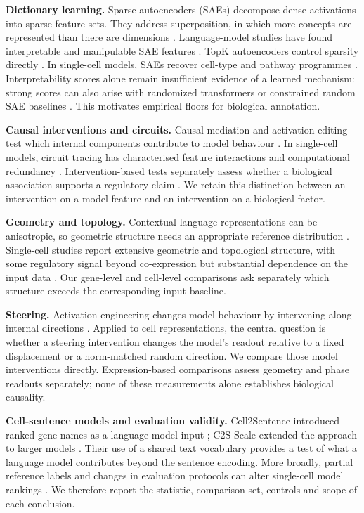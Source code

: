 \documentclass[review,authoryear,12pt]{elsarticle}
\begin{document}
\textbf{Dictionary learning.} Sparse autoencoders (SAEs) decompose dense activations into sparse feature
sets. They address superposition, in which more concepts are represented than there are dimensions
\citep{ref21}. Language-model studies have found interpretable and manipulable SAE features
\citep{ref17,ref18,ref19}. TopK autoencoders control sparsity directly \citep{ref20}. In single-cell
models, SAEs recover cell-type and pathway programmes \citep{ref6,ref7}. Interpretability scores alone
remain insufficient evidence of a learned mechanism: strong scores can also arise with randomized
transformers or constrained random SAE baselines \citep{refRandomTransformerSAE,refRandomSAEBaselines}.
This motivates empirical floors for biological annotation.

\textbf{Causal interventions and circuits.} Causal mediation and activation editing test which internal
components contribute to model behaviour \citep{refCausalMediation,ref22}. In single-cell models,
circuit tracing has characterised feature interactions and computational redundancy
\citep{ref10,ref11}. Intervention-based tests separately assess whether a biological association
supports a regulatory claim \citep{ref14}. We retain this distinction between an intervention on a
model feature and an intervention on a biological factor.

\textbf{Geometry and topology.} Contextual language representations can be anisotropic, so geometric
structure needs an appropriate reference distribution \citep{refAnisotropy}. Single-cell studies
report extensive geometric and topological structure, with some regulatory signal beyond
co-expression but substantial dependence on the input data \citep{ref12,ref13,ref37}. Our gene-level
and cell-level comparisons ask separately which structure exceeds the corresponding input baseline.

\textbf{Steering.} Activation engineering changes model behaviour by intervening along internal
directions \citep{ref48,ref49}. Applied to cell representations, the central question is whether a
steering intervention changes the model's readout relative to a fixed displacement or a
norm-matched random direction. We compare those model interventions directly. Expression-based
comparisons assess geometry and phase readouts separately; none of these measurements alone
establishes biological causality.

\textbf{Cell-sentence models and evaluation validity.} Cell2Sentence introduced ranked gene names as a
language-model input \citep{ref1}; C2S-Scale extended the approach to larger models \citep{ref2}.
Their use of a shared text vocabulary provides a test of what a language model contributes beyond
the sentence encoding. More broadly, partial reference labels and changes in evaluation protocols
can alter single-cell model rankings \citep{ref39,ref40}. We therefore report the statistic, comparison
set, controls and scope of each conclusion.
\end{document}
